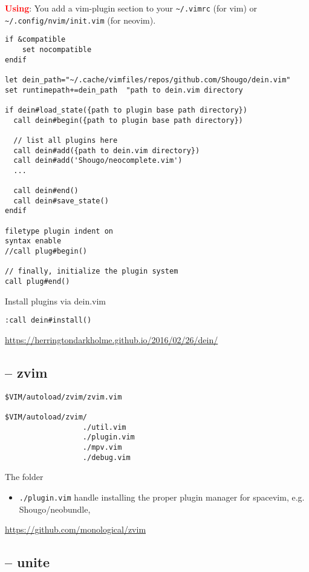 \textcolor{red}{\bf Using}: You add a vim-plugin section to your \verb!~/.vimrc!
(for vim) or \verb!~/.config/nvim/init.vim! (for neovim).
\begin{verbatim}
if &compatible
	set nocompatible
endif

let dein_path="~/.cache/vimfiles/repos/github.com/Shougo/dein.vim"
set runtimepath+=dein_path  "path to dein.vim directory

if dein#load_state({path to plugin base path directory})
  call dein#begin({path to plugin base path directory})

  // list all plugins here
  call dein#add({path to dein.vim directory})
  call dein#add('Shougo/neocomplete.vim')
  ...

  call dein#end()
  call dein#save_state()
endif

filetype plugin indent on
syntax enable
//call plug#begin()

// finally, initialize the plugin system
call plug#end()
\end{verbatim}

Install plugins via dein.vim
\begin{verbatim}
:call dein#install()
\end{verbatim}
\url{https://herringtondarkholme.github.io/2016/02/26/dein/}

\subsection{-- zvim}
\label{sec:zvim}


\begin{verbatim}
$VIM/autoload/zvim/zvim.vim

$VIM/autoload/zvim/
                  ./util.vim
                  ./plugin.vim
                  ./mpv.vim
                  ./debug.vim

\end{verbatim}

The folder
\begin{itemize}
  \item \verb!./plugin.vim! handle installing the proper plugin manager for
  spacevim, e.g. Shougo/neobundle, 
\end{itemize}
\url{https://github.com/monological/zvim}

\subsection{-- unite}
\label{sec:unite-vim-plugin}
\label{sec:vim-plugin-unite}


